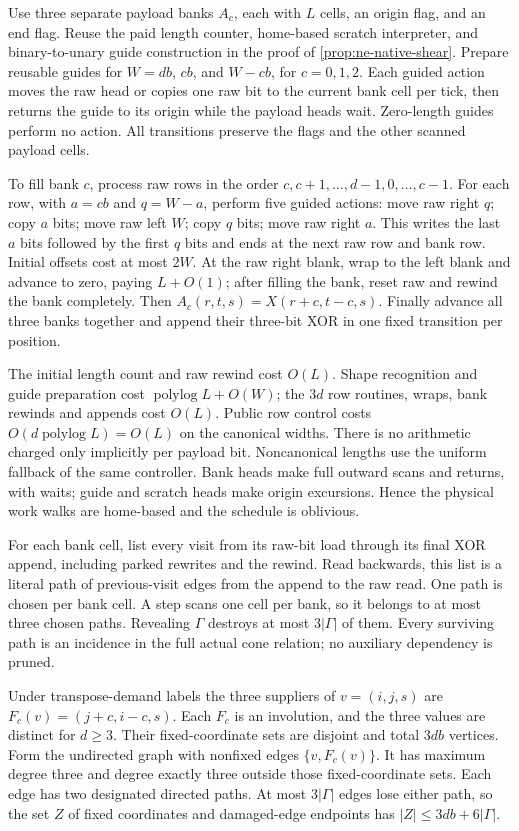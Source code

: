 \begin{informalproof}
Use three separate payload banks $A_c$, each with $L$ cells, an origin
flag, and an end flag. Reuse the paid length counter, home-based scratch
interpreter, and binary-to-unary guide construction in the proof of
\cref{prop:ne-native-shear}. Prepare reusable guides for $W=db$, $cb$,
and $W-cb$, for $c=0,1,2$. Each guided action moves the raw head or
copies one raw bit to the current bank cell per tick, then returns the
guide to its origin while the payload heads wait. Zero-length guides
perform no action. All transitions preserve the flags and the other
scanned payload cells.

To fill bank $c$, process raw rows in the order
$c,c+1,\ldots,d-1,0,\ldots,c-1$. For each row, with $a=cb$ and
$q=W-a$, perform five guided actions: move raw right $q$; copy $a$
bits; move raw left $W$; copy $q$ bits; move raw right $a$.
This writes the last $a$ bits followed by the first $q$ bits and ends
at the next raw row and bank row. Initial offsets cost at most $2W$.
At the raw right blank, wrap to the left blank and advance to zero,
paying $L+O(1)$; after filling the bank, reset raw and rewind the
bank completely. Then
$A_c(r,t,s)=X(r+c,t-c,s)$.
Finally advance all three banks together and append their three-bit
XOR in one fixed transition per position.

The initial length count and raw rewind cost $O(L)$. Shape recognition
and guide preparation cost $\operatorname{polylog}L+O(W)$; the $3d$
row routines, wraps, bank rewinds and appends cost $O(L)$.
Public row control costs $O(d\operatorname{polylog}L)=O(L)$ on the
canonical widths. There is no arithmetic charged only implicitly per
payload bit. Noncanonical lengths use the uniform fallback of the
same controller. Bank heads make full outward scans and returns,
with waits; guide and scratch heads make origin excursions. Hence
the physical work walks are home-based and the schedule is oblivious.

For each bank cell, list every visit from its raw-bit load through
its final XOR append, including parked rewrites and the rewind.
Read backwards, this list is a literal path of previous-visit edges
from the append to the raw read. One path is chosen per bank cell.
A step scans one cell per bank, so it belongs to at most three chosen
paths. Revealing $\Gamma$ destroys at most $3|\Gamma|$ of them.
Every surviving path is an incidence in the full actual cone relation;
no auxiliary dependency is pruned.

Under transpose-demand labels the three suppliers of $v=(i,j,s)$ are
$F_c(v)=(j+c,i-c,s)$. Each $F_c$ is an involution, and the three values
are distinct for $d\ge3$. Their fixed-coordinate sets are disjoint and
total $3db$ vertices. Form the undirected graph with nonfixed edges
$\{v,F_c(v)\}$. It has maximum degree three and degree exactly three
outside those fixed-coordinate sets. Each edge has two designated
directed paths. At most $3|\Gamma|$ edges lose either path, so the
set $Z$ of fixed coordinates and damaged-edge endpoints has
$|Z|\le3db+6|\Gamma|$.


\end{informalproof}
